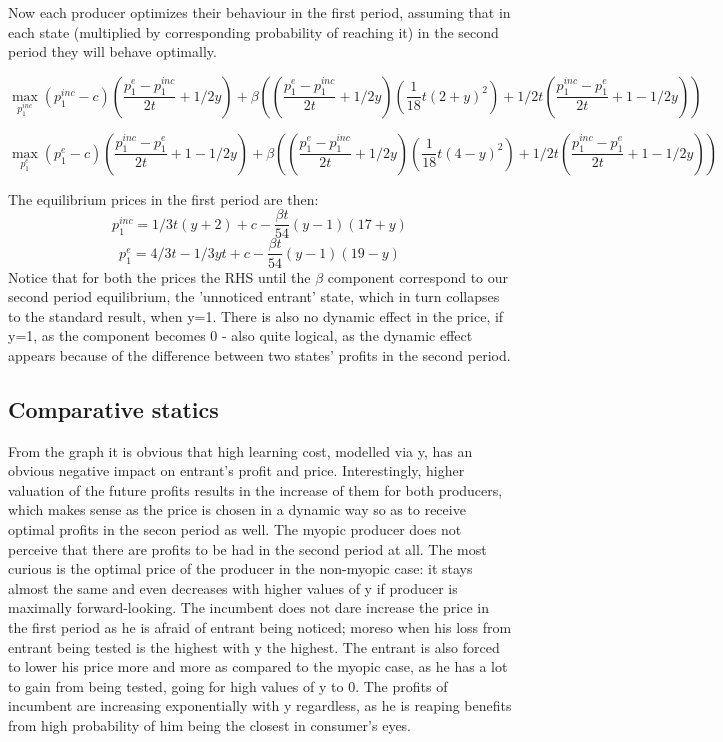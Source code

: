 \documentclass{article}
\begin{document}
Now each producer optimizes their behaviour in the first period, assuming that in each state (multiplied by corresponding probability of reaching it) in the second period they will behave optimally. 

	


 $$
    \max_{p^{inc}_1} {}
   (p^{inc}_1-c)(\frac{p^{e}_1-p^{inc}_1}{2t} + 1/2y) 
    + \beta((\frac{p^{e}_1-p^{inc}_1}{2t} + 1/2y)(\frac{1}{18}t(2+y)^2) + 
    1/2t(\frac{p^{inc}_1-p^{e}_1}{2t} + 1 - 1/2y))
    $$
    
    $$
   \max_{p^{e}_1} {}
   (p^{e}_1-c)(\frac{p^{inc}_1-p^{e}_1}{2t} + 1 -1/2y) 
    + \beta((\frac{p^{e}_1-p^{inc}_1}{2t} + 1/2y)(\frac{1}{18}t(4-y)^2) + 
    1/2t(\frac{p^{inc}_1-p^{e}_1}{2t} + 1 - 1/2y))
    $$

The equilibrium prices in the first period are then:
$$
p^{inc}_1 =1/3t(y+ 2) + c - \frac{\beta t }{54}(y-1)(17+y) $$
$$ p^{e}_1 =4/3t - 1/3yt + c - \frac{\beta t}{54}(y-1)(19-y)$$
Notice that for both the prices the RHS until the $ \beta$ component correspond to our second period equilibrium, the 'unnoticed entrant' state, which in turn collapses to the standard result, when y=1. There is also no dynamic effect in the price, if y=1, as the component becomes 0 - also quite logical, as the dynamic effect appears because of the difference between two states' profits in the second period. 

\subsection{Comparative statics}

From the graph it is obvious that high learning cost, modelled via y, has an obvious negative impact on entrant's profit and price. Interestingly, higher valuation of the future profits results in the increase of them for both producers, which makes sense as the price is chosen in a dynamic way so as to receive optimal profits in the secon period as well. The myopic producer does not perceive that there are profits to be had in the second period at all. The most curious is the optimal price of the producer in the non-myopic case: it stays almost the same and even decreases with higher values of y if producer is maximally forward-looking. The incumbent does not dare increase the price in the first period as he is afraid of entrant being noticed; moreso when his loss from entrant being tested is the highest with y the highest. The entrant is also forced to lower his price more and more as compared to the myopic case, as he has a lot to gain from being tested, going for high values of y to 0. The profits of incumbent are increasing exponentially with y regardless, as he is reaping benefits from high probability of him being the closest in consumer's eyes. 
\end{document}
